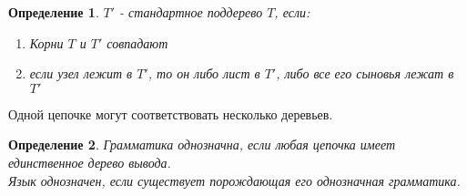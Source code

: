 \documentclass[11pt]{article}
\newtheorem*{df}{Определение}
\theoremstyle{break}
\begin{document}
\begin{sloppypar}
\begin{df}
 $T'$ - стандартное поддерево $T$, если:
 \begin{enumerate}
  \item Корни $T$ и $T'$ совпадают
  \item если узел лежит в $T'$, то он либо лист в $T'$, либо все его сыновья лежат в $T'$
 \end{enumerate}
\end{df}

Одной цепочке могут соответствовать несколько деревьев.

\begin{df}
 Грамматика однозначна, если любая цепочка имеет единственное дерево вывода. \\
 Язык однозначен, если существует порождающая его однозначная грамматика.
\end{df}

\end{sloppypar}
\end{document}
